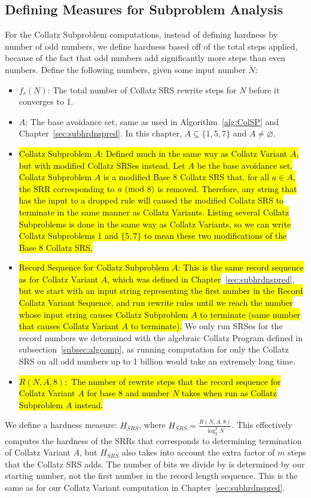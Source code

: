 \subsection{Defining Measures for Subproblem Analysis} \label{subsec:rewritemeasuredefs}
For the Collatz Subproblem computations, instead of defining hardness by number of odd numbers, we define hardness based off of the total steps applied, because of the fact that odd numbers add significantly more steps than even numbers. Define the following numbers, given some input number $N$:
\begin{itemize}
    \item $f_r(N)$: The total number of Collatz SRS rewrite steps for $N$ before it converges to 1.
    \item $A$: The base avoidance set, same as used in Algorithm~\ref{alg:ColSP} and Chapter~\ref{sec:subhrdnspred}. In this chapter, $A \subseteq \{1, 5, 7\}$ and $A \ne \varnothing$. 
    \item \hl{Collatz Subproblem $A$: Defined much in the same way as Collatz Variant $A$, but with modified Collatz SRSes instead. Let $A$ be the base avoidance set.  Collatz Subproblem $A$ is a modified Base 8 Collatz SRS that, for all $a \in A$, the SRR corresponding to $a \ (\mathrm{mod}\ 8)$ is removed. Therefore, any string that has the input to a dropped rule will caused the modified Collatz SRS to terminate in the same manner as Collatz Variants. Listing several Collatz Subproblems is done in the same way as Collatz Variants, so we can write Collatz Subproblems 1 and $\{5,7\}$ to mean these two modifications of the Base 8 Collatz SRS.}
    \item \hl{Record Sequence for Collatz Subproblem $A$: This is the same record sequence as for Collatz Variant $A$, which was defined in Chapter}~\ref{sec:subhrdnspred}, \hl{but we start with an input string representing the first number in the Record Collatz Variant Sequence, and run rewrite rules until we reach the number whose input string causes Collatz Subproblem $A$ to terminate (same number that causes Collatz Variant $A$ to terminate).} We only run SRSes for the record numbers we determined with the algebraic Collatz Program defined in subsection~\ref{subsec:algcomp}, as running computation for only the Collatz SRS on all odd numbers up to 1 billion would take an extremely long time.
    \item \hl{$R(N, A, 8):$ The number of rewrite steps that the record sequence for Collatz Variant $A$ for base 8 and number $N$ takes when run as Collatz Subproblem $A$ instead.}
\end{itemize}
We define a hardness measure: $H_{SRS}$, where $H_{SRS} = \frac{R(N, A, 8)}{\log_2^2{N}}$. This effectively computes the hardness of the SRRs that corresponds to determining termination of Collatz Variant $A$, but $H_{SRS}$ also takes into account the extra factor of $m$ steps that the Collatz SRS adds. The number of bits we divide by is determined by our starting number, not the first number in the record length sequence. This is the same as for our Collatz Variant computation in Chapter~\ref{sec:subhrdnspred}.

